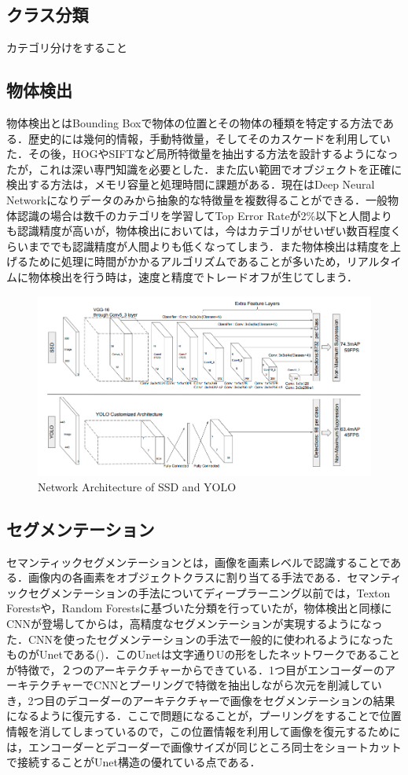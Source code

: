 \subsection*{クラス分類}
カテゴリ分けをすること

\subsection*{物体検出}
物体検出とはBounding Boxで物体の位置とその物体の種類を特定する方法である．歴史的には幾何的情報，手動特徴量，そしてそのカスケードを利用していた．その後，HOGやSIFTなど局所特徴量を抽出する方法を設計するようになったが，これは深い専門知識を必要とした．また広い範囲でオブジェクトを正確に検出する方法は，メモリ容量と処理時間に課題がある．現在はDeep Neural Networkになりデータのみから抽象的な特徴量を複数得ることができる．一般物体認識の場合は数千のカテゴリを学習してTop Error Rateが2\%以下と人間よりも認識精度が高いが，物体検出においては，今はカテゴリがせいぜい数百程度くらいまででも認識精度が人間よりも低くなってしまう．また物体検出は精度を上げるために処理に時間がかかるアルゴリズムであることが多いため，リアルタイムに物体検出を行う時は，速度と精度でトレードオフが生じてしまう．

\begin{figure}[h]
\centering
\includegraphics[width=0.7\linewidth]{fig/yolo_ssd.png}
\caption{Network Architecture of SSD and YOLO}
\label{fig:YOLO}
\end{figure}

\subsection*{セグメンテーション}
セマンティックセグメンテーションとは，画像を画素レベルで認識することである．画像内の各画素をオブジェクトクラスに割り当てる手法である．セマンティックセグメンテーションの手法についてディープラーニング以前では，Texton Forestsや，Random Forestsに基づいた分類を行っていたが，物体検出と同様にCNNが登場してからは，高精度なセグメンテーションが実現するようになった．CNNを使ったセグメンテーションの手法で一般的に使われるようになったものがUnetである()．このUnetは文字通りUの形をしたネットワークであることが特徴で，２つのアーキテクチャーからできている．1つ目がエンコーダーのアーキテクチャーでCNNとプーリングで特徴を抽出しながら次元を削減していき，2つ目のデコーダーのアーキテクチャーで画像をセグメンテーションの結果になるように復元する．ここで問題になることが，プーリングをすることで位置情報を消してしまっているので，この位置情報を利用して画像を復元するためには，エンコーダーとデコーダーで画像サイズが同じところ同士をショートカットで接続することがUnet構造の優れている点である．

